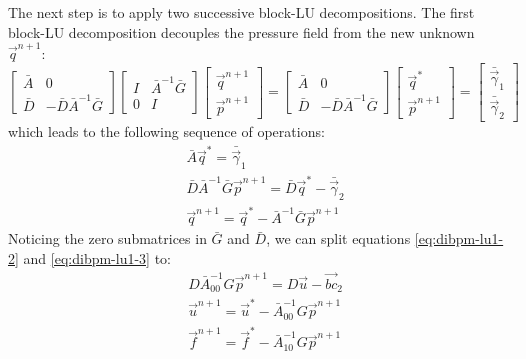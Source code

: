 The next step is to apply two successive block-LU decompositions.
The first block-LU decomposition decouples the pressure field from the new unknown $\vec{q}^{n+1}$:
\begin{equation}
    \begin{bmatrix}
        \bar{A} & 0 \\
        \bar{D} & -\bar{D}\bar{A}^{-1}\bar{G}
    \end{bmatrix}
    \begin{bmatrix}
        I & \bar{A}^{-1}\bar{G} \\
        0 & I
    \end{bmatrix}
    \begin{bmatrix}
        \vec{q}^{n+1} \\
        \vec{p}^{n+1}
    \end{bmatrix}
    =
    \begin{bmatrix}
        \bar{A} & 0 \\
        \bar{D} & -\bar{D}\bar{A}^{-1}\bar{G}
    \end{bmatrix}
    \begin{bmatrix}
        \vec{q}^* \\
        \vec{p}^{n+1}
    \end{bmatrix}
    =
    \begin{bmatrix}
        \bar{\vec{\gamma}}_1 \\
        \bar{\vec{\gamma}}_2
    \end{bmatrix}
\end{equation}
which leads to the following sequence of operations:
\begin{subequations}
    \begin{align}
        & \bar{A} \vec{q}^* = \bar{\vec{\gamma}}_1\label{eq:dibpm-lu1-1} \\
        & \bar{D}\bar{A}^{-1}\bar{G} \vec{p}^{n+1} = \bar{D} \vec{q}^* - \bar{\vec{\gamma}}_2\label{eq:dibpm-lu1-2} \\
        & \vec{q}^{n+1} = \vec{q}^* - \bar{A}^{-1}\bar{G} \vec{p}^{n+1}\label{eq:dibpm-lu1-3}
    \end{align}
\end{subequations}
Noticing the zero submatrices in $\bar{G}$ and $\bar{D}$, we can split equations \eqref{eq:dibpm-lu1-2} and \eqref{eq:dibpm-lu1-3} to:
\begin{subequations}
    \begin{align}
        & D\bar{A}_{00}^{-1}G \vec{p}^{n+1} = D \vec{u} - \vec{bc}_2\label{eq:dibpm-lu1-4} \\
        & \vec{u}^{n+1} = \vec{u}^* - \bar{A}_{00}^{-1}G \vec{p}^{n+1}\label{eq:dibpm-lu1-5} \\
        & \vec{f}^{n+1} = \vec{f}^* - \bar{A}_{10}^{-1}G \vec{p}^{n+1}\label{eq:dibpm-lu1-6}
    \end{align}
\end{subequations}
